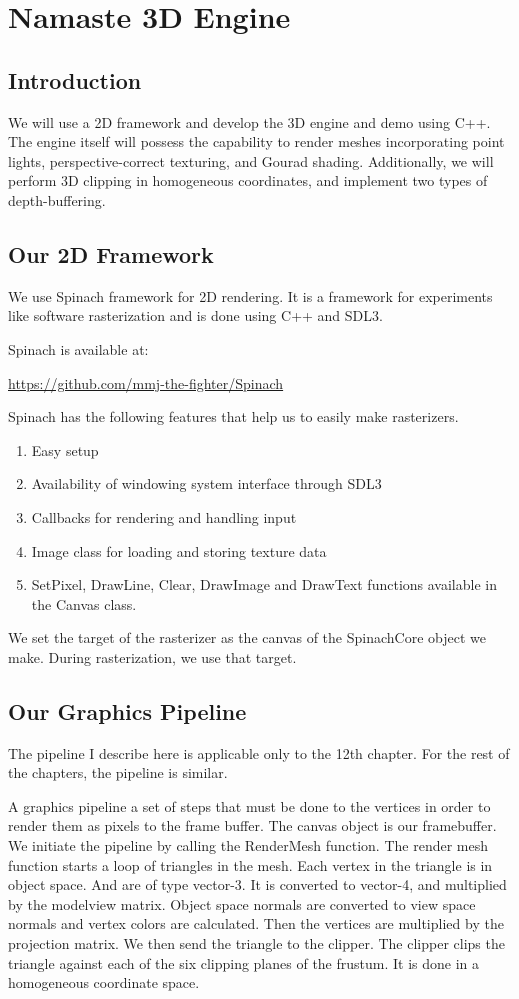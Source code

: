 \chapter{Namaste 3D Engine}
\section{Introduction}
We will use a 2D framework and develop the 3D engine and demo using C++. The engine itself will possess the capability to render meshes incorporating point lights, perspective-correct texturing, and Gourad shading. Additionally, we will perform 3D clipping in homogeneous coordinates, and implement two types of depth-buffering.  
\section{Our 2D Framework}
We use Spinach framework for 2D rendering. It is a framework for experiments like software rasterization and is done using C++ and SDL3. 

Spinach is available at:

\url{https://github.com/mmj-the-fighter/Spinach}

Spinach has the following features that help us to easily make rasterizers.
\begin{enumerate}
	\item Easy setup
    \item Availability of windowing system interface through SDL3
    \item Callbacks for rendering and handling input
    \item Image class for loading and storing texture data
    \item SetPixel, DrawLine, Clear, DrawImage and DrawText functions available in the Canvas class.
\end{enumerate}
We set the target of the rasterizer as the canvas of the SpinachCore object we make. During rasterization, we use that target. 

\section{Our Graphics Pipeline}
The pipeline I describe here is applicable only to the 12th chapter. For the rest of the chapters, the pipeline is similar.

A graphics pipeline a set of steps that must be done to the vertices in order to render them as pixels to the frame buffer. The canvas object is our framebuffer. We initiate the pipeline by calling the RenderMesh function. The render mesh function starts a loop of triangles in the mesh. Each vertex in the triangle is in object space. And are of type vector-3. It is converted to vector-4, and multiplied by the modelview matrix. Object space normals are converted to view space normals and vertex colors are calculated. Then the vertices are multiplied by the projection matrix. We then send the triangle to the clipper. The clipper clips the triangle against each of the six clipping planes of the frustum. It is done in a homogeneous coordinate space.

